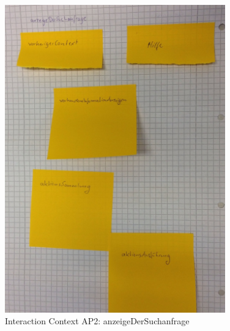 \begin{figure}[H]
\centering
\includegraphics[angle=90, width=0.85\textwidth]  {./images/abstract/version2/anzeigeDerSuchanfrage.JPG}
\caption{Interaction Context AP2: anzeigeDerSuchanfrage}
\label{interfaceContents43}
\end{figure}


